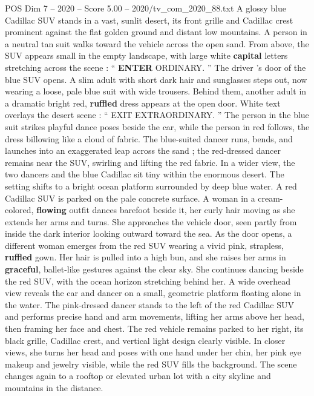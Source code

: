 \begin{textsample}{POS Dim 7 – 2020 – Score 5.00 – 2020/tv\_com\_2020\_88.txt}  \label{ex:f7_pos_088}
A glossy blue Cadillac SUV stands in a vast, sunlit desert, its front grille and Cadillac crest prominent against the flat golden ground and distant low mountains.
A person in a neutral tan suit walks toward the vehicle across the open sand.
From above, the SUV appears small in the empty landscape, with large white \textbf{capital} letters stretching across the scene : “ \textbf{ENTER} ORDINARY. ” The driver ’s door of the blue SUV opens.
A slim adult with short dark hair and sunglasses steps out, now wearing a loose, pale blue suit with wide trousers.
Behind them, another adult in a dramatic bright red, \textbf{ruffled} dress appears at the open door.
White text overlays the desert scene : “ EXIT EXTRAORDINARY. ” The person in the blue suit strikes playful dance poses beside the car, while the person in red follows, the dress billowing like a cloud of fabric.
The blue-suited dancer runs, bends, and launches into an exaggerated leap across the sand ; the red-dressed dancer remains near the SUV, swirling and lifting the red fabric.
In a wider view, the two dancers and the blue Cadillac sit tiny within the enormous desert.
The setting shifts to a bright ocean platform surrounded by deep blue water.
A red Cadillac SUV is parked on the pale concrete surface.
A woman in a cream-colored, \textbf{flowing} outfit dances barefoot beside it, her curly hair moving as she extends her arms and turns.
She approaches the vehicle door, seen partly from inside the dark interior looking outward toward the sea.
As the door opens, a different woman emerges from the red SUV wearing a vivid pink, strapless, \textbf{ruffled} gown.
Her hair is pulled into a high bun, and she raises her arms in \textbf{graceful}, ballet-like gestures against the clear sky.
She continues dancing beside the red SUV, with the ocean horizon stretching behind her.
A wide overhead view reveals the car and dancer on a small, geometric platform floating alone in the water.
The pink-dressed dancer stands to the left of the red Cadillac SUV and performs precise hand and arm movements, lifting her arms above her head, then framing her face and chest.
The red vehicle remains parked to her right, its black grille, Cadillac crest, and vertical light design clearly visible.
In closer views, she turns her head and poses with one hand under her chin, her pink eye makeup and jewelry visible, while the red SUV fills the background.
The scene changes again to a rooftop or elevated urban lot with a city skyline and mountains in the distance.

\end{textsample}
